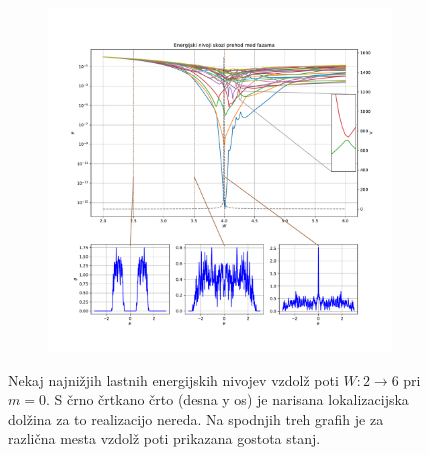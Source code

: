 \begin{figure}[H]
\centering
\begin{subfigure}{\textwidth}
\includegraphics[width=\linewidth]{Figures/Nicegraph.pdf}
\end{subfigure}
\caption{Nekaj najnižjih lastnih energijskih nivojev vzdolž poti $W: 2 \to 6$ pri $m=0$. S črno črtkano črto (desna y os) je narisana lokalizacijska dolžina za to realizacijo nereda. Na spodnjih treh grafih je za različna mesta vzdolž poti prikazana gostota stanj.}
\label{fig:Nicegraph}
\end{figure}

